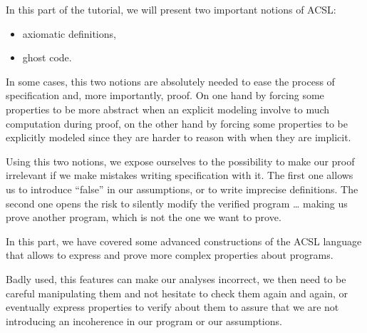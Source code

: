 In this part of the tutorial, we will present two important notions of
ACSL:



\begin{itemize}
\item axiomatic definitions,
\item ghost code.
\end{itemize}


In some cases, this two notions are absolutely needed to ease the
process of specification and, more importantly, proof. On one hand by
forcing some properties to be more abstract when an explicit modeling
involve to much computation during proof, on the other hand by forcing
some properties to be explicitly modeled since they are harder to reason
with when they are implicit.




Using this two notions, we expose ourselves to the possibility to make
our proof irrelevant if we make mistakes writing specification with it.
The first one allows us to introduce ``false'' in our assumptions, or to
write imprecise definitions. The second one opens the risk to silently
modify the verified program \ldots{} making us prove another program,
which is not the one we want to prove.











\horizontalLine



In this part, we have covered some advanced constructions of the ACSL
language that allows to express and prove more complex properties about
programs.

Badly used, this features can make our analyses incorrect, we then need
to be careful manipulating them and not hesitate to check them again and
again, or eventually express properties to verify about them to assure
that we are not introducing an incoherence in our program or our
assumptions.
